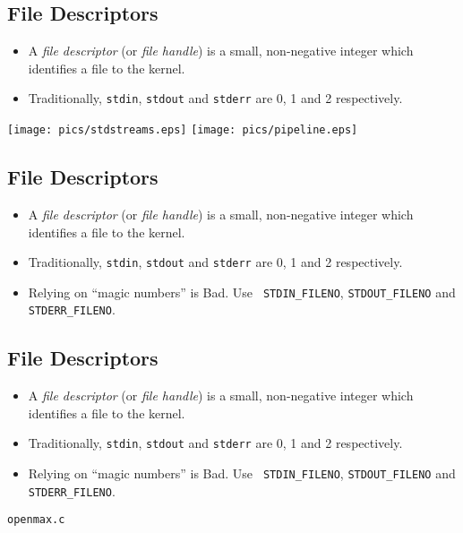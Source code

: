 \documentclass[xga]{xdvislides}
\begin{document}
\subsection{File Descriptors}
\begin{itemize}
	\item A {\em file descriptor} (or {\em file handle}) is a small,
		non-negative integer which identifies a file to the kernel.
	\item Traditionally, {\tt stdin}, {\tt stdout} and {\tt stderr}
		are 0, 1 and 2 respectively.
\end{itemize}
\texttt{[image: pics/stdstreams.eps]}
\texttt{[image: pics/pipeline.eps]}



\subsection{File Descriptors}
\begin{itemize}
	\item A {\em file descriptor} (or {\em file handle}) is a small,
		non-negative integer which identifies a file to the kernel.
	\item Traditionally, {\tt stdin}, {\tt stdout} and {\tt stderr}
		are 0, 1 and 2 respectively.
	\item Relying on ``magic numbers'' is Bad\texttrademark.  Use {\tt
		STDIN\_FILENO}, {\tt STDOUT\_FILENO} and {\tt STDERR\_FILENO}.
\end{itemize}

\subsection{File Descriptors}
\begin{itemize}
	\item A {\em file descriptor} (or {\em file handle}) is a small,
		non-negative integer which identifies a file to the kernel.
	\item Traditionally, {\tt stdin}, {\tt stdout} and {\tt stderr}
		are 0, 1 and 2 respectively.
	\item Relying on ``magic numbers'' is Bad\texttrademark.  Use {\tt
		STDIN\_FILENO}, {\tt STDOUT\_FILENO} and {\tt STDERR\_FILENO}.
\end{itemize}

\addvspace{.5in}
\begin{center}
\Huge
\verb+openmax.c+
\normalsize
\end{center}
\end{document}
